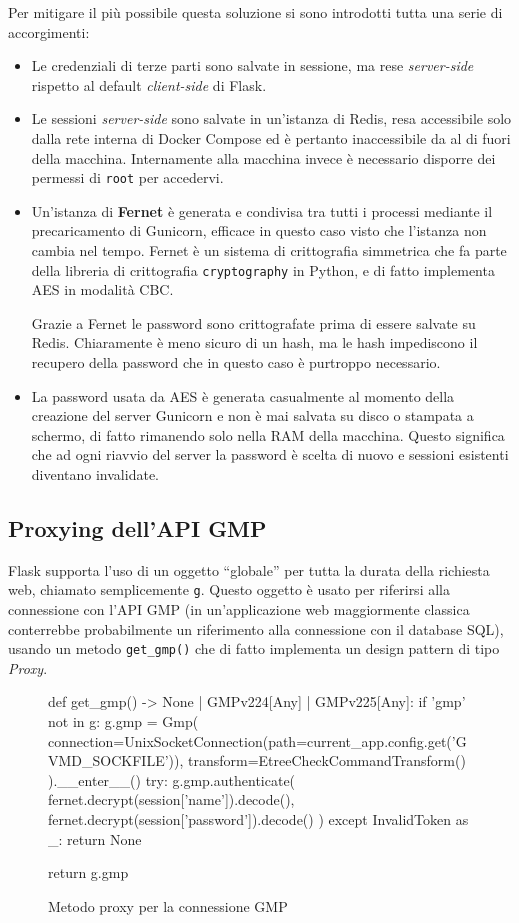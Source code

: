 Per mitigare il più possibile questa soluzione si sono introdotti tutta una serie di accorgimenti:
\begin{itemize}
    \item Le credenziali di terze parti sono salvate in sessione, ma rese \emph{server-side} rispetto al default \emph{client-side} di Flask.
    \item Le sessioni \emph{server-side} sono salvate in un'istanza di Redis, resa accessibile solo dalla rete interna di Docker Compose ed è pertanto inaccessibile da al di fuori della macchina. Internamente alla macchina invece è necessario disporre dei permessi di \texttt{root} per accedervi.
    \item Un'istanza di \textbf{Fernet} è generata e condivisa tra tutti i processi mediante il precaricamento di Gunicorn, efficace in questo caso visto che l'istanza non cambia nel tempo. Fernet è un sistema di crittografia simmetrica che fa parte della libreria di crittografia \texttt{cryptography} in Python, e di fatto implementa AES in modalità CBC.
    
    Grazie a Fernet le password sono crittografate prima di essere salvate su Redis. Chiaramente è meno sicuro di un hash, ma le hash impediscono il recupero della password che in questo caso è purtroppo necessario.
    \item La password usata da AES è generata casualmente al momento della creazione del server Gunicorn e non è mai salvata su disco o stampata a schermo, di fatto rimanendo solo nella RAM della macchina. Questo significa che ad ogni riavvio del server la password è scelta di nuovo e sessioni esistenti diventano invalidate.
\end{itemize}

\subsection{Proxying dell'API GMP}
Flask supporta l'uso di un oggetto ``globale'' per tutta la durata della richiesta web, chiamato semplicemente \texttt{g}. Questo oggetto è usato per riferirsi alla connessione con l'API GMP (in un'applicazione web maggiormente classica conterrebbe probabilmente un riferimento alla connessione con il database SQL), usando un metodo \texttt{get\_gmp()} che di fatto implementa un design pattern di tipo \emph{Proxy}.

\begin{figure}
\begin{pycode}
def get_gmp() -> None | GMPv224[Any] | GMPv225[Any]:
    if 'gmp' not in g:
        g.gmp = Gmp(
            connection=UnixSocketConnection(path=current_app.config.get('GVMD_SOCKFILE')),
            transform=EtreeCheckCommandTransform()
        ).__enter__()
        try:
            g.gmp.authenticate(
                fernet.decrypt(session['name']).decode(),
                fernet.decrypt(session['password']).decode()
            )
        except InvalidToken as _:
            return None

    return g.gmp
\end{pycode}
\caption{Metodo proxy per la connessione GMP}
\end{figure}

